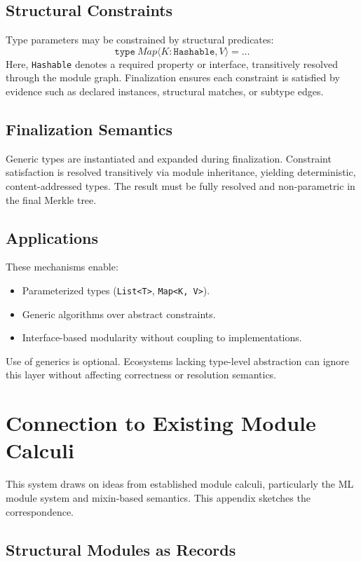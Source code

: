 \documentclass[sigplan,screen]{acmart}
\begin{document}
\subsection{Structural Constraints}

Type parameters may be constrained by structural predicates:
\[
\texttt{type}~Map\langle K: \texttt{Hashable}, V \rangle = \ldots
\]
Here, \texttt{Hashable} denotes a required property or interface, transitively resolved through the module graph. Finalization ensures each constraint is satisfied by evidence such as declared instances, structural matches, or subtype edges.

\subsection{Finalization Semantics}

Generic types are instantiated and expanded during finalization. Constraint satisfaction is resolved transitively via module inheritance, yielding deterministic, content-addressed types. The result must be fully resolved and non-parametric in the final Merkle tree.

\subsection{Applications}

These mechanisms enable:
\begin{itemize}
  \item Parameterized types (\texttt{List<T>}, \texttt{Map<K, V>}).
  \item Generic algorithms over abstract constraints.
  \item Interface-based modularity without coupling to implementations.
\end{itemize}

Use of generics is optional. Ecosystems lacking type-level abstraction can ignore this layer without affecting correctness or resolution semantics.

\section{Connection to Existing Module Calculi}
\label{appendix:module-calculi}

This system draws on ideas from established module calculi, particularly the ML module system and mixin-based semantics. This appendix sketches the correspondence.

\subsection{Structural Modules as Records}
\end{document}
